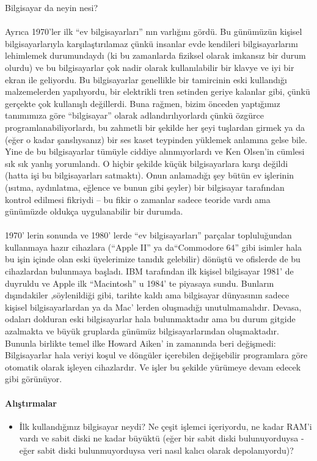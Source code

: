 \documentclass[10pt,a5paper]{book}
\begin{document}
\begin{section}{Bilgisayar da neyin nesi?}
\paragraph{}{Ayrıca 1970'ler ilk “ev bilgisayarları” nın varlığını gördü. Bu günümüzün kişisel bilgisayarlarıyla karşılaştırılamaz çünkü insanlar evde kendileri bilgisayarlarını lehimlemek durumundaydı (ki bu zamanlarda fiziksel olarak imkansız bir durum olurdu) ve bu bilgisayarlar çok nadir olarak kullanılabilir bir klavye ve iyi bir ekran ile geliyordu. Bu bilgisayarlar genellikle bir tamircinin eski kullandığı malzemelerden yapılıyordu, bir elektrikli tren setinden geriye kalanlar gibi, çünkü gerçekte çok kullanışlı değillerdi. Buna rağmen, bizim önceden yaptığımız tanımımıza göre “bilgisayar” olarak adlandırılıyorlardı çünkü özgürce programlanabiliyorlardı, bu zahmetli bir şekilde her şeyi tuşlardan girmek ya da (eğer o kadar şanslıysanız) bir ses kaset teypinden yüklemek anlamına gelse bile. Yine de bu bilgisayarlar tümüyle ciddiye alınmıyorlardı ve Ken Olsen'in cümlesi sık sık yanlış yorumlandı. O hiçbir şekilde küçük bilgisayarlara karşı değildi (hatta işi bu bilgisayarları satmaktı). Onun anlamadığı şey bütün ev işlerinin (ısıtma, aydınlatma, eğlence ve bunun gibi şeyler) bir bilgisayar tarafından kontrol edilmesi fikriydi – bu fikir o zamanlar sadece teoride vardı ama günümüzde oldukça uygulanabilir bir durumda.}
\paragraph{}{1970' lerin sonunda ve 1980' lerde “ev bilgisayarları” parçalar topluluğundan kullanmaya hazır  cihazlara (“Apple II” ya da“Commodore 64” gibi isimler hala bu işin içinde olan eski üyelerimize tanıdık gelebilir) dönüştü ve ofislerde de bu cihazlardan bulunmaya başladı. IBM tarafından ilk kişisel bilgisayar 1981' de duyruldu ve Apple ilk “Macintosh” u 1984' te piyasaya sundu. Bunların dışındakiler ,söylenildiği gibi, tarihte kaldı ama bilgisayar dünyasının sadece kişisel bilgisayarlardan ya da Mac' lerden oluşmadığı unutulmamalıdır.  Devasa, odaları dolduran eski bilgisayarlar hala bulunmaktadır ama bu durum gitgide azalmakta ve büyük gruplarda günümüz bilgisayarlarından oluşmaktadır. Bununla birlikte temel ilke Howard Aiken' in zamanında beri değişmedi: Bilgisayarlar hala veriyi koşul ve döngüler içerebilen değişebilir programlara göre otomatik olarak işleyen cihazlardır. Ve işler bu şekilde yürümeye devam edecek gibi görünüyor.}
\paragraph{Alıştırmalar}{}
\begin{itemize}
 \item İlk kullandığınız bilgisayar neydi? Ne çeşit işlemci içeriyordu, ne kadar RAM'i vardı ve sabit diski ne kadar büyüktü (eğer bir sabit diski bulunuyorduysa - eğer sabit diski bulunmuyorduysa veri nasıl kalıcı olarak depolanıyordu)?
\end{itemize}
\end{section}
\end{document}
